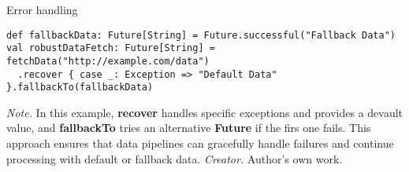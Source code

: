 \begin{table}[h!]
\caption{Error handling}
\begin{lstlisting}
def fallbackData: Future[String] = Future.successful("Fallback Data")
val robustDataFetch: Future[String] = fetchData("http://example.com/data")
  .recover { case _: Exception => "Default Data" }.fallbackTo(fallbackData)
\end{lstlisting}
\small
\textit{Note.} In this example, \textbf{recover} handles specific exceptions and provides a devault value, and \textbf{fallbackTo} tries an alternative \textbf{Future} if the firs one fails. This approach ensures that data pipelines can gracefully handle failures and continue processing with default or fallback data.
\textit{Creator.} Author's own work.
\end{table}